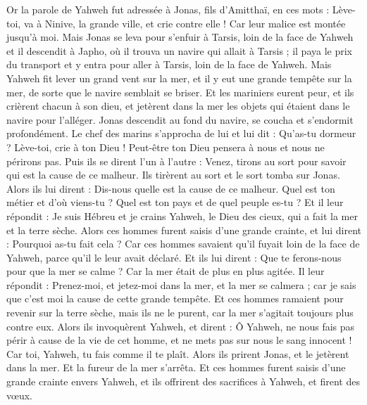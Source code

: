 \begin{multicols}{2}
\VerseOne{}Or la parole de Yahweh fut adressée à Jonas, fils d'Amitthaï, en ces mots :
Lève-toi, va à Ninive, la grande ville, et crie contre elle ! Car leur malice est montée jusqu'à moi.
Mais Jonas se leva pour s'enfuir à Tarsis, loin de la face de Yahweh et il descendit à Japho, où il trouva un navire qui allait à Tarsis ; il paya le prix du transport et y entra pour aller à Tarsis, loin de la face de Yahweh.
Mais Yahweh fit lever un grand vent sur la mer, et il y eut une grande tempête sur la mer, de sorte que le navire semblait se briser.
Et les mariniers eurent peur, et ils crièrent chacun à son dieu, et jetèrent dans la mer les objets qui étaient dans le navire pour l'alléger. Jonas descendit au fond du navire, se coucha et s'endormit profondément.
Le chef des marins s'approcha de lui et lui dit : Qu'as-tu dormeur ? Lève-toi, crie à ton Dieu ! Peut-être ton Dieu pensera à nous et nous ne périrons pas.
Puis ils se dirent l'un à l'autre : Venez, tirons au sort pour savoir qui est la cause de ce malheur. Ils tirèrent au sort et le sort tomba sur Jonas.
Alors ils lui dirent : Dis-nous quelle est la cause de ce malheur. Quel est ton métier et d'où viens-tu ? Quel est ton pays et de quel peuple es-tu ?
Et il leur répondit : Je suis Hébreu et je crains Yahweh, le Dieu des cieux, qui a fait la mer et la terre sèche.
Alors ces hommes furent saisis d'une grande crainte, et lui dirent : Pourquoi as-tu fait cela ? Car ces hommes savaient qu'il fuyait loin de la face de Yahweh, parce qu'il le leur avait déclaré.
Et ils lui dirent : Que te ferons-nous pour que la mer se calme ? Car la mer était de plus en plus agitée.
Il leur répondit : Prenez-moi, et jetez-moi dans la mer, et la mer se calmera ; car je sais que c'est moi la cause de cette grande tempête.
Et ces hommes ramaient pour revenir sur la terre sèche, mais ils ne le purent, car la mer s'agitait toujours plus contre eux.
Alors ils invoquèrent Yahweh, et dirent : Ô Yahweh, ne nous fais pas périr à cause de la vie de cet homme, et ne mets pas sur nous le sang innocent ! Car toi, Yahweh, tu fais comme il te plaît.
Alors ils prirent Jonas, et le jetèrent dans la mer. Et la fureur de la mer s'arrêta.
Et ces hommes furent saisis d'une grande crainte envers Yahweh, et ils offrirent des sacrifices à Yahweh, et firent des vœux.

\end{multicols}
